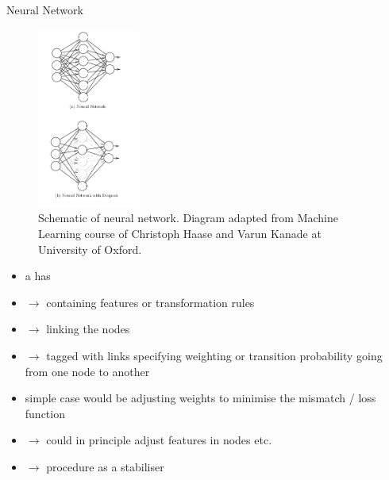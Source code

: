 \documentclass[xcolor=x11names,compress]{beamer}
\renewcommand{\(}{\begin{columns}}
\renewcommand{\)}{\end{columns}}
\newcommand{\<}[1]{\begin{column}{#1}}
\renewcommand{\>}{\end{column}}
\begin{document}
\begin{frame}{Neural Network}

\parbox{0.3\textwidth}{
\begin{figure}
  \includegraphics[width=0.3\textwidth]{network_schematic_vert}
  \caption{Schematic of neural network. Diagram adapted from Machine Learning
  course of Christoph Haase and Varun Kanade at University of Oxford.}
\end{figure}
}\parbox{0.7\textwidth}{
\begin{itemize}
  \item a  has
  \item[] $\to$  containing features or transformation rules
  \item[] $\to$  linking the nodes
  \item[] $\to$  tagged with links specifying weighting or
  transition probability going from one node to another
  \item simple case would be adjusting weights to minimise the mismatch / loss
  function
  \item[] $\to$ could in principle adjust features in nodes etc.
  \item[] $\to$  procedure as a stabiliser
\end{itemize}
}

\end{frame}

\end{document}

